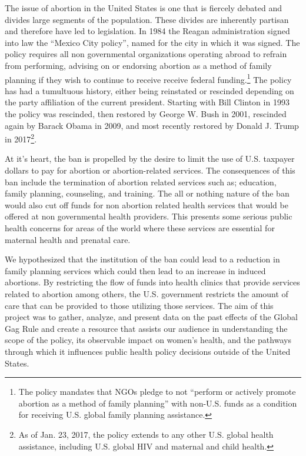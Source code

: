 \documentclass[11pt,]{article}
\begin{document}
The issue of abortion in the United States is one that is fiercely
debated and divides large segments of the population. These divides are
inherently partisan and therefore have led to legislation. In 1984 the
Reagan administration signed into law the ``Mexico City policy'', named
for the city in which it was signed. The policy requires all non
governmental organizations operating abroad to refrain from performing,
advising on or endorsing abortion as a method of family planning if they
wish to continue to receive receive federal funding.\footnote{The policy
  mandates that NGOs pledge to not ``perform or actively promote
  abortion as a method of family planning'' with non-U.S. funds as a
  condition for receiving U.S. global family planning assistance.} The
policy has had a tumultuous history, either being reinstated or
rescinded depending on the party affiliation of the current president.
Starting with Bill Clinton in 1993 the policy was rescinded, then
restored by George W. Bush in 2001, rescinded again by Barack Obama in
2009, and most recently restored by Donald J. Trump in 2017\footnote{As
  of Jan. 23, 2017, the policy extends to any other U.S. global health
  assistance, including U.S. global HIV and maternal and child health.}.

At it's heart, the ban is propelled by the desire to limit the use of
U.S. taxpayer dollars to pay for abortion or abortion-related services.
The consequences of this ban include the termination of abortion related
services such as; education, family planning, counseling, and training.
The all or nothing nature of the ban would also cut off funds for non
abortion related health services that would be offered at non
governmental health providers. This presents some serious public health
concerns for areas of the world where these services are essential for
maternal health and prenatal care.

We hypothesized that the institution of the ban could lead to a
reduction in family planning services which could then lead to an
increase in induced abortions. By restricting the flow of funds into
health clinics that provide services related to abortion among others,
the U.S. government restricts the amount of care that can be provided to
those utilizing those services. The aim of this project was to gather,
analyze, and present data on the past effects of the Global Gag Rule and
create a resource that assists our audience in understanding the scope
of the policy, its observable impact on women's health, and the pathways
through which it influences public health policy decisions outside of
the United States.
\end{document}
